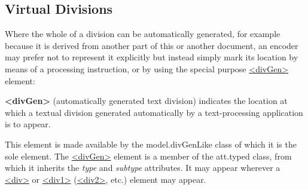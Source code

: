 \subsection[{Virtual Divisions}]{Virtual Divisions}\label{DSVIRT}\par
Where the whole of a division can be automatically generated, for example because it is derived from another part of this or another document, an encoder may prefer not to represent it explicitly but instead simply mark its location by means of a processing instruction, or by using the special purpose \hyperref[TEI.divGen]{<divGen>} element: 
\begin{sansreflist}
  
\item [\textbf{<divGen>}] (automatically generated text division) indicates the location at which a textual division generated automatically by a text-processing application is to appear.
\end{sansreflist}
\par
This element is made available by the \textsf{model.divGenLike} class of which it is the sole element. The \hyperref[TEI.divGen]{<divGen>} element is a member of the \textsf{att.typed} class, from which it inherits the {\itshape type} and {\itshape subtype} attributes. It may appear wherever a \hyperref[TEI.div]{<div>} or \hyperref[TEI.div1]{<div1>} (\hyperref[TEI.div2]{<div2>}, etc.) element may appear.\par
